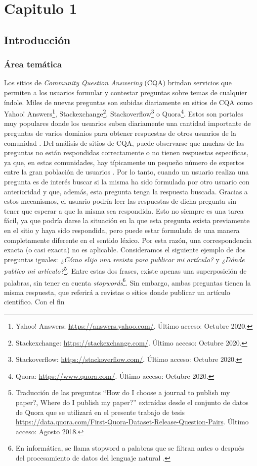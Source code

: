 \chapter*{Capitulo 1}\label{ch:plan}
\section{Introducción}

\subsection{Área temática}
\noindent Los sitios de \textit{Community Question Answering} (CQA) brindan servicios que permiten a los usuarios formular y contestar preguntas sobre temas de cualquier índole. Miles de nuevas preguntas son subidas diariamente en sitios de CQA como Yahoo! Answers\footnote{Yahoo! Answers: \url{https://answers.yahoo.com/}. Último acceso: Octubre 2020.}, Stackexchange\footnote{Stackexchange: \url{https://stackexchange.com/}. Último acceso: Octubre 2020.}, Stackoverflow\footnote{Stackoverflow: \url{https://stackoverflow.com/}. Último acceso: Octubre 2020.} o Quora\footnote{Quora: \url{https://www.quora.com/}. Último acceso: Octubre 2020.}. Estos son portales muy populares donde los usuarios suben diariamente una cantidad importante de preguntas de varios dominios para obtener respuestas de otros usuarios de la comunidad \citep{anuyah2017can}. Del análisis de sitios de CQA, puede observarse que muchas de las preguntas no están respondidas correctamente o no tienen respuestas específicas, ya que, en estas comunidades, hay típicamente un pequeño número de expertos entre la gran población de usuarios \citep{yang2013cqarank}. Por lo tanto, cuando un usuario realiza una pregunta es de interés buscar si la misma ha sido formulada por otro usuario con anterioridad y que, además, esta pregunta tenga la respuesta buscada. Gracias a estos mecanismos, el usuario podría leer las respuestas de dicha pregunta sin tener que esperar a que la misma sea respondida. Esto no siempre es una tarea fácil, ya que podría darse la situación en la que esta pregunta exista previamente en el sitio y haya sido respondida, pero puede estar formulada de una manera completamente diferente en el sentido léxico. Por esta razón, una correspondencia exacta (o casi exacta) no es aplicable. Consideramos el siguiente ejemplo de dos preguntas iguales: \textit{¿Cómo elijo una revista para publicar mi artículo?} y \textit{¿Dónde publico mi artículo?}\footnote{Traducción de las preguntas “How do I choose a journal to publish my paper?, Where do I publish my paper?” extraídas desde el conjunto de datos de Quora que se utilizará en el presente trabajo de tesis \url{https://data.quora.com/First-Quora-Dataset-Release-Question-Pairs}. Último acceso: Agosto 2018.}. Entre estas dos frases, existe apenas una superposición de palabras, sin tener en cuenta \textit{stopwords}\footnote{En informática, se llama stopword a palabras que se filtran antes o después del procesamiento de datos del lenguaje natural \citep{leskovec2014mining}.}. Sin embargo, ambas preguntas tienen la misma respuesta, que referirá a revistas o sitios donde publicar un artículo científico. Con el fin 